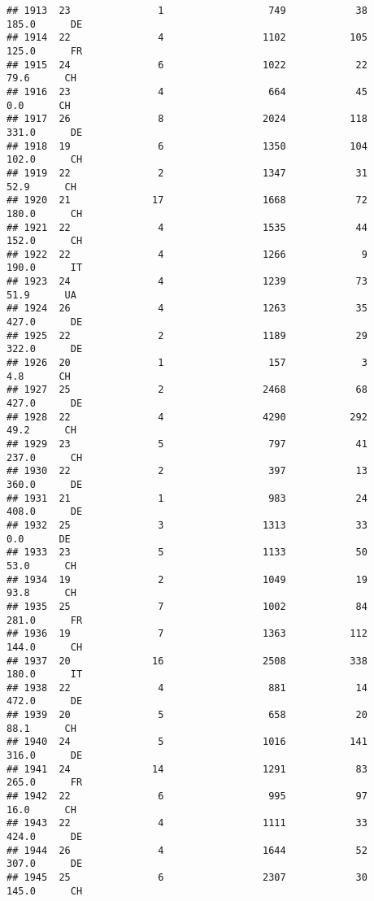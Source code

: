 \documentclass[
]{article}
\begin{document}
\begin{verbatim}
## 1913  23               1                  749            38    185.0      DE
## 1914  22               4                 1102           105    125.0      FR
## 1915  24               6                 1022            22     79.6      CH
## 1916  23               4                  664            45      0.0      CH
## 1917  26               8                 2024           118    331.0      DE
## 1918  19               6                 1350           104    102.0      CH
## 1919  22               2                 1347            31     52.9      CH
## 1920  21              17                 1668            72    180.0      CH
## 1921  22               4                 1535            44    152.0      CH
## 1922  22               4                 1266             9    190.0      IT
## 1923  24               4                 1239            73     51.9      UA
## 1924  26               4                 1263            35    427.0      DE
## 1925  22               2                 1189            29    322.0      DE
## 1926  20               1                  157             3      4.8      CH
## 1927  25               2                 2468            68    427.0      DE
## 1928  22               4                 4290           292     49.2      CH
## 1929  23               5                  797            41    237.0      CH
## 1930  22               2                  397            13    360.0      DE
## 1931  21               1                  983            24    408.0      DE
## 1932  25               3                 1313            33      0.0      DE
## 1933  23               5                 1133            50     53.0      CH
## 1934  19               2                 1049            19     93.8      CH
## 1935  25               7                 1002            84    281.0      FR
## 1936  19               7                 1363           112    144.0      CH
## 1937  20              16                 2508           338    180.0      IT
## 1938  22               4                  881            14    472.0      DE
## 1939  20               5                  658            20     88.1      CH
## 1940  24               5                 1016           141    316.0      DE
## 1941  24              14                 1291            83    265.0      FR
## 1942  22               6                  995            97     16.0      CH
## 1943  22               4                 1111            33    424.0      DE
## 1944  26               4                 1644            52    307.0      DE
## 1945  25               6                 2307            30    145.0      CH

\end{verbatim}
\end{document}
